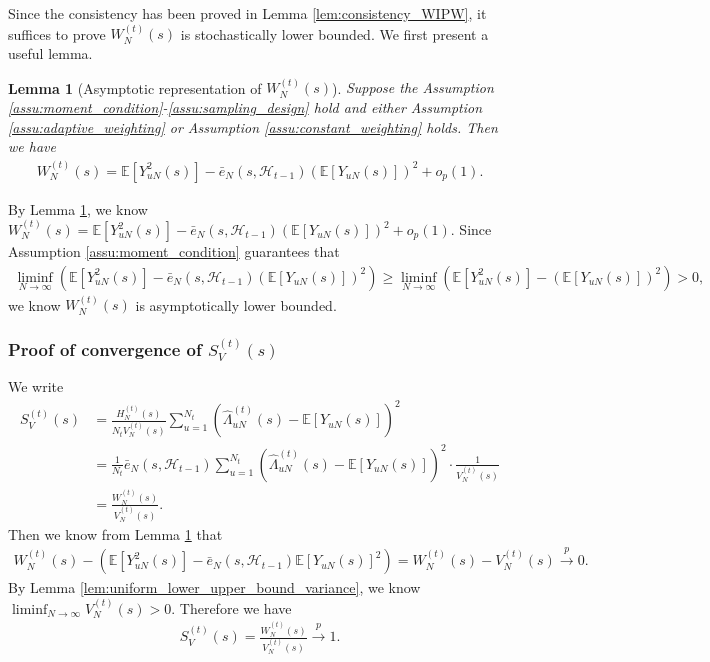 \documentclass[12pt]{article}
\newtheorem{lemma}{Lemma}
\newcommand{\E}{\mathbb E}								%
\newcommand{\convp}{\overset p \rightarrow}             %
\begin{document}
\noindent Since the consistency has been proved in Lemma \ref{lem:consistency_WIPW}, it suffices to prove $W_N^{(t)}(s)$ is stochastically lower bounded. We first present a useful lemma. 

\begin{lemma}[Asymptotic representation of $W_N^{(t)}(s)$]\label{lem:weak_law_W_N}
	Suppose the Assumption \ref{assu:moment_condition}-\ref{assu:sampling_design} hold and either Assumption \ref{assu:adaptive_weighting} or Assumption \ref{assu:constant_weighting} holds. Then we have 
	\begin{align*}
		W_N^{(t)}(s)=\E[Y_{uN}^2(s)]-\bar e_N(s,\mathcal{H}_{t-1})(\E[Y_{uN}(s)])^2+o_p(1).
	\end{align*}
\end{lemma}
\noindent By Lemma \ref{lem:weak_law_W_N}, we know $W_N^{(t)}(s)=\E[Y_{uN}^2(s)]-\bar e_N(s,\mathcal{H}_{t-1})(\E[Y_{uN}(s)])^2+o_p(1)$. Since Assumption \ref{assu:moment_condition} guarantees that
\begin{align*}
	\liminf_{N\rightarrow\infty}(\E[Y_{uN}^2(s)]-\bar e_N(s,\mathcal{H}_{t-1})(\E[Y_{uN}(s)])^2)\geq \liminf_{N\rightarrow\infty}(\E[Y_{uN}^2(s)]-(\E[Y_{uN}(s)])^2)>0,
\end{align*}
we know $W_N^{(t)}(s)$ is asymptotically lower bounded. 


\subsubsection{Proof of convergence of $S_V^{(t)}(s)$}

We write 
\begin{align*}
	S_{V}^{(t)}(s)
	&
	=\frac{H_N^{(t)}(s)}{N_tV^{(t)}_{N}(s)}\sum_{u=1}^{N_t}(\hat{\Lambda}_{uN}^{(t)}(s)-\E[Y_{uN}(s)])^2\\
	&
	=\frac{1}{N_t}\bar e_N(s,\mathcal{H}_{t-1})\sum_{u=1}^{N_t} (\hat{\Lambda}_{uN}^{(t)}(s)-\E[Y_{uN}(s)])^2\cdot\frac{1}{V_N^{(t)}(s)}\\
	&
	= \frac{W_N^{(t)}(s)}{V_N^{(t)}(s)}.
\end{align*}
Then we know from Lemma \ref{lem:weak_law_W_N} that
\begin{align*}
	W_N^{(t)}(s)-\left(\E[Y_{uN}^2(s)]-\bar e_N(s,\mathcal{H}_{t-1})\E[Y_{uN}(s)]^2\right)=W_N^{(t)}(s)-V_N^{(t)}(s)\convp 0.
\end{align*}
By Lemma \ref{lem:uniform_lower_upper_bound_variance}, we know $\liminf_{N\rightarrow\infty}V_N^{(t)}(s)>0$. Therefore we have 
\begin{align*}
	S_{V}^{(t)}(s)=\frac{W_N^{(t)}(s)}{V_{N}^{(t)}(s)}\convp 1.
\end{align*}
\end{document}
